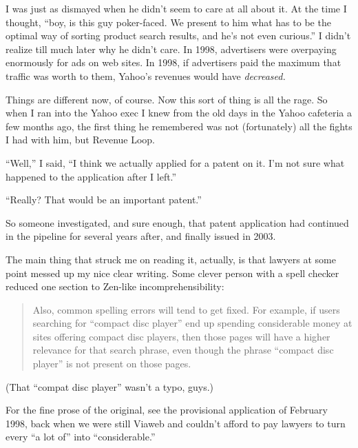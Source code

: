 I was just as dismayed when he didn't seem to care at all about it. At
the time I thought, ``boy, is this guy poker-faced. We present to him
what has to be the optimal way of sorting product search results, and
he's not even curious.'' I didn't realize till much later why he didn't
care. In 1998, advertisers were overpaying enormously for ads on web
sites. In 1998, if advertisers paid the maximum that traffic was worth
to them, Yahoo's revenues would have \emph{decreased.}

Things are different now, of course. Now this sort of thing is all the
rage. So when I ran into the Yahoo exec I knew from the old days in the
Yahoo cafeteria a few months ago, the first thing he remembered was not
(fortunately) all the fights I had with him, but Revenue Loop.

``Well,'' I said, ``I think we actually applied for a patent on it. I'm
not sure what happened to the application after I left.''

``Really? That would be an important patent.''

So someone investigated, and sure enough, that patent application had
continued in the pipeline for several years after, and finally issued in
2003.

The main thing that struck me on reading it, actually, is that lawyers
at some point messed up my nice clear writing. Some clever person with a
spell checker reduced one section to Zen-like incomprehensibility:

\begin{quote}
Also, common spelling errors will tend to get fixed. For example, if
users searching for ``compact disc player'' end up spending considerable
money at sites offering compact disc players, then those pages will have
a higher relevance for that search phrase, even though the phrase
``compact disc player'' is not present on those pages.
\end{quote}

(That ``compat disc player'' wasn't a typo, guys.)

For the fine prose of the original, see the provisional application of
February 1998, back when we were still Viaweb and couldn't afford to pay
lawyers to turn every ``a lot of'' into ``considerable.''